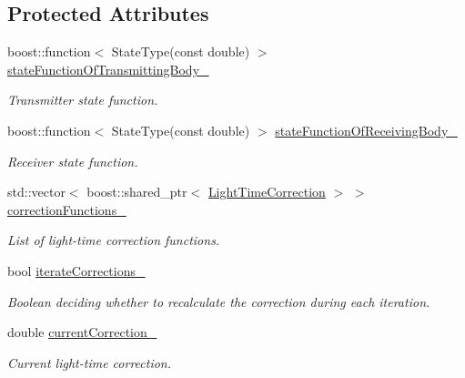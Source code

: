 \subsection*{Protected Attributes}
\begin{DoxyCompactItemize}
\item 
boost\+::function$<$ State\+Type(const double) $>$ \hyperlink{classtudat_1_1observation__models_1_1LightTimeCalculator_af259e010986b119ed8792a70aea82553}{state\+Function\+Of\+Transmitting\+Body\+\_\+}
\begin{DoxyCompactList}\small\item\em Transmitter state function. \end{DoxyCompactList}\item 
boost\+::function$<$ State\+Type(const double) $>$ \hyperlink{classtudat_1_1observation__models_1_1LightTimeCalculator_a14e286292e8443509fb55c29668b063b}{state\+Function\+Of\+Receiving\+Body\+\_\+}
\begin{DoxyCompactList}\small\item\em Receiver state function. \end{DoxyCompactList}\item 
std\+::vector$<$ boost\+::shared\+\_\+ptr$<$ \hyperlink{classtudat_1_1observation__models_1_1LightTimeCorrection}{Light\+Time\+Correction} $>$ $>$ \hyperlink{classtudat_1_1observation__models_1_1LightTimeCalculator_a588c0ec0d95dd20dec85f65e8234cea8}{correction\+Functions\+\_\+}
\begin{DoxyCompactList}\small\item\em List of light-\/time correction functions. \end{DoxyCompactList}\item 
bool \hyperlink{classtudat_1_1observation__models_1_1LightTimeCalculator_a585fe91b5f74288844fc855771f73dff}{iterate\+Corrections\+\_\+}
\begin{DoxyCompactList}\small\item\em Boolean deciding whether to recalculate the correction during each iteration. \end{DoxyCompactList}\item 
double \hyperlink{classtudat_1_1observation__models_1_1LightTimeCalculator_a09cedc2fa76a64a4c07e4e5c77f39c36}{current\+Correction\+\_\+}\hypertarget{classtudat_1_1observation__models_1_1LightTimeCalculator_a09cedc2fa76a64a4c07e4e5c77f39c36}{}\label{classtudat_1_1observation__models_1_1LightTimeCalculator_a09cedc2fa76a64a4c07e4e5c77f39c36}

\begin{DoxyCompactList}\small\item\em Current light-\/time correction. \end{DoxyCompactList}\end{DoxyCompactItemize}


